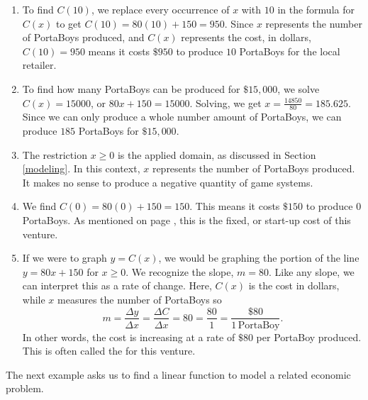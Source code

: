 {
\begin{enumerate}

\item  To find $C(10)$, we replace every occurrence of $x$ with $10$ in the formula for $C(x)$ to get $C(10) = 80(10)+150 = 950$.  Since $x$ represents the number of PortaBoys produced, and $C(x)$ represents the cost, in dollars, $C(10) = 950$ means it costs $\$950$ to produce $10$ PortaBoys for the local retailer.

\item  To find how many PortaBoys can be produced for $\$15, \! 000$, we solve $C(x) = 15000$, or $80x+150 = 15000$.  Solving, we get  $x = \frac{14850}{80} = 185.625$. Since we can only produce a whole number amount of PortaBoys, we can produce $185$ PortaBoys for $\$15, \! 000$. 


\item  The restriction $x \geq 0$ is the applied domain, as discussed in Section \ref{modeling}.  In this context, $x$ represents the number of PortaBoys produced.  It makes no sense to produce a negative quantity of game systems.


\item  We find $C(0) = 80(0)+150 = 150$.  This means it costs $\$150$ to produce $0$ PortaBoys.  As mentioned on page \pageref{pricerevenuecostprofit}, this is the fixed, or start-up cost of this venture.

\item  If we were to graph $y = C(x)$, we would be graphing the portion of the line $y = 80x + 150$ for $x \geq 0$.  We recognize the slope, $m = 80$.  Like any slope, we can interpret this as a rate of change.  Here, $C(x)$ is the cost in dollars, while $x$ measures the number of PortaBoys so \[ m = \dfrac{\Delta y}{\Delta x} = \dfrac{\Delta C}{\Delta x} = 80 = \dfrac{80}{1} = \dfrac{\$ 80}{1 \, \mbox{PortaBoy}}.\] In other words,  the cost is increasing at a rate of $\$80$ per PortaBoy produced.  This is often called the  for this venture.  

\end{enumerate}
}

\medskip

The next example asks us to find a linear function to model a related economic problem.

